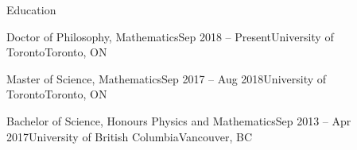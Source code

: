 \documentclass{resume}
\begin{document}

\begin{rSection}{Education}


\begin{rSubsection}{Doctor of Philosophy, Mathematics}{Sep 2018 -- Present}{University of Toronto}{Toronto, ON}
\item[]
\end{rSubsection}
\vspace{-1cm}
\begin{rSubsection}{Master of Science, Mathematics}{Sep 2017 -- Aug 2018}{University of Toronto}{Toronto, ON}
\item[]
\end{rSubsection}
\vspace{-1cm}
\begin{rSubsection}{Bachelor of Science, Honours Physics and Mathematics}{Sep 2013 -- Apr 2017}{University of British Columbia}{Vancouver, BC}
\item[]
\end{rSubsection}
\vspace{-1cm}
\end{rSection}

\end{document}
